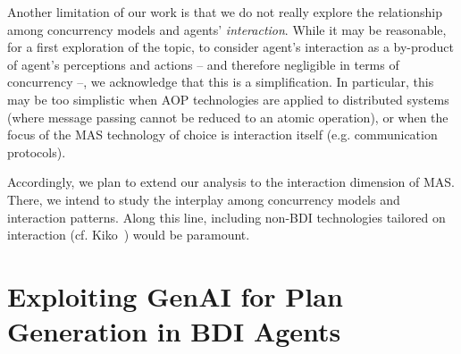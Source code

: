 Another limitation of our work is that 
we do not really explore the relationship among concurrency models and agents' \emph{interaction}.
%
While it may be reasonable,
for a first exploration of the topic,
to consider agent's interaction as a by-product of agent's perceptions and actions
-- and therefore negligible in terms of concurrency --,
we acknowledge that this is a simplification.
%
In particular, 
this may be too simplistic when \ac{AOP} technologies are applied to distributed systems
(where message passing cannot be reduced to an atomic operation),
or when the focus of the \ac{MAS} technology of choice is interaction itself
(e.g. communication protocols).

Accordingly,
we plan to extend our analysis to the interaction dimension of \ac{MAS}.
%
There, 
we intend to study the interplay among concurrency models and interaction patterns.
%
Along this line,
including non-\ac{BDI} technologies tailored on interaction
(cf. Kiko~\cite{ChristieSC2023})
would be paramount.

\chapter{Exploiting GenAI for Plan Generation in \acs{BDI} Agents}
\label{chap:genai}

